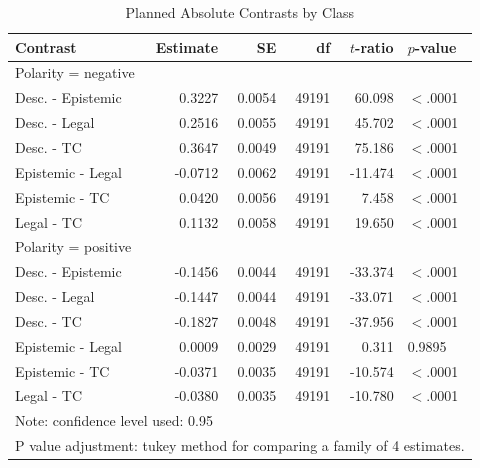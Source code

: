 \documentclass{article}
\begin{document}
\begin{table}[ht]
\centering
\begin{tabular}{lrrrrl}
  \hline
Contrast & Estimate & SE & df & $t$-ratio & $p$-value \\ 
  \hline
\multicolumn{6}{l}{Polarity = negative}\\
\cmidrule{1-1}
\rowcolor{gray!25}Desc. - Epistemic & 0.3227 & 0.0054 & 49191 & 60.098 & $<$.0001 \\ 
  Desc. - Legal & 0.2516 & 0.0055 & 49191 & 45.702 & $<$.0001 \\ 
 \rowcolor{gray!25} Desc. - TC & 0.3647 & 0.0049 & 49191 & 75.186 & $<$.0001 \\ 
  Epistemic - Legal & -0.0712 & 0.0062 & 49191 & -11.474 & $<$.0001 \\ 
 \rowcolor{gray!25} Epistemic - TC & 0.0420 & 0.0056 & 49191 & 7.458 & $<$.0001 \\ 
  Legal - TC & 0.1132 & 0.0058 & 49191 & 19.650 & $<$.0001 \\ 
   \midrule
\multicolumn{6}{l}{Polarity = positive}\\
\cmidrule{1-1}
\rowcolor{gray!25}Desc. - Epistemic & -0.1456 & 0.0044 & 49191 & -33.374 & $<$.0001 \\ 
  Desc. - Legal & -0.1447 & 0.0044 & 49191 & -33.071 & $<$.0001 \\ 
 \rowcolor{gray!25} Desc. - TC & -0.1827 & 0.0048 & 49191 & -37.956 & $<$.0001 \\ 
  Epistemic - Legal & 0.0009 & 0.0029 & 49191 & 0.311 & 0.9895 \\ 
  \rowcolor{gray!25}Epistemic - TC & -0.0371 & 0.0035 & 49191 & -10.574 & $<$.0001 \\ 
  Legal - TC & -0.0380 & 0.0035 & 49191 & -10.780 & $<$.0001 \\ 
   \hline
   \multicolumn{6}{l}{{\footnotesize Note: confidence level used: 0.95}}\\
\multicolumn{6}{l}{{\footnotesize P value adjustment: tukey method for comparing a family of 4 estimates.}}\\
\end{tabular}
\caption{Planned Absolute Contrasts by Class}
\label{tab:s2m2}
\end{table}
\fi
\end{document}
